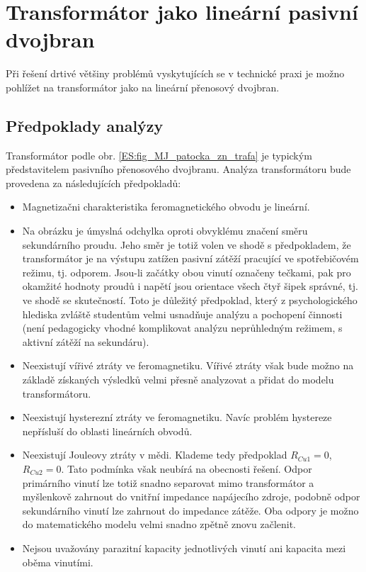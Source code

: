   \section{Transformátor jako lineární pasivní dvojbran}
    Při řešení drtivé většiny problémů vyskytujících se v technické praxi je možno pohlížet na
    transformátor jako na lineární přenosový dvojbran.  
    \subsection{Předpoklady analýzy}
      Transformátor podle obr. \ref{ES:fig_MJ_patocka_zn_trafa} je typickým představitelem  pasivního 
      přenosového dvojbranu. Analýza transformátoru bude provedena za následujících předpokladů:
      \begin{itemize}
        \addtolength{\itemsep}{-0.5\baselineskip}
        \item Magnetizačni charakteristika feromagnetického obvodu je lineární.	 
        \item Na obrázku je úmyslná odchylka oproti obvyklému značení směru sekundárního proudu. Jeho směr 
              je totiž volen ve shodě s předpokladem, že transformátor je na výstupu zatížen pasivní zátěží 
              pracující ve spotřebičovém režimu, tj. odporem. Jsou-li začátky obou vinutí označeny tečkami, 
              pak pro okamžité hodnoty proudů i napětí jsou orientace všech čtyř šipek správné, tj. ve shodě 
              se skutečností. Toto je důležitý předpoklad, který z psychologického hlediska zvláště studentům 
              velmi usnadňuje analýzu a pochopení činnosti (není pedagogicky vhodné komplikovat analýzu 
              neprůhledným režimem, s aktivní zátěží na sekundáru).
        \item Neexistují vířivé ztráty ve feromagnetiku. Vířivé ztráty však bude možno na základě
              získaných výsledků velmi přesně analyzovat a přidat do modelu transformátoru.
        \item Neexistují hysterezní ztráty ve feromagnetiku. Navíc problém hystereze nepřísluší do
              oblasti lineárních obvodů.
        \item Neexistují Jouleovy ztráty v mědi. Klademe tedy předpoklad \(R_{Cu1} = 0\), \(R_{Cu2}
              = 0\). Tato podmínka však neubírá na obecnosti řešení. Odpor primárního vinutí lze totiž snadno 
              separovat mimo transformátor a myšlenkově zahrnout do vnitřní impedance napájecího zdroje, 
              podobně odpor sekundárního vinutí lze zahrnout do impedance zátěže. Oba odpory je možno do 
              matematického modelu velmi snadno zpětně znovu začlenit.
        \item Nejsou uvažovány parazitní kapacity jednotlivých vinutí ani kapacita mezi oběma vinutími.
      \end{itemize}
          
